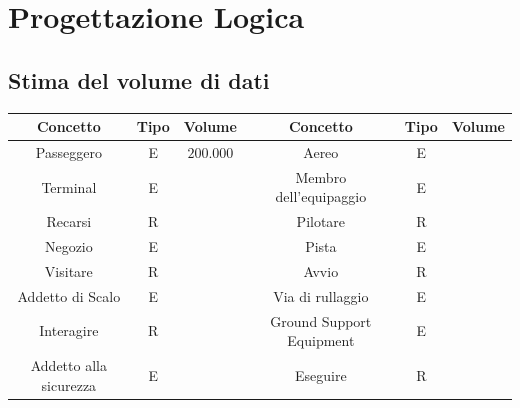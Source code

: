 
\newpage

\enlargethispage{1\linewidth}

\section{Progettazione Logica} %

\subsection{Stima del volume di dati}

\begin{tabular}{ | c  c  c | c  c  c | } %
	\hline
	\textbf{Concetto} & \textbf{Tipo} & \textbf{Volume} & \textbf{Concetto} & \textbf{Tipo} & \textbf{Volume}\\
	\hline
	\textsf{\small Passeggero} & \textsf{\small E} & \textsf{\small $ 200.000$} & \textsf{\small Aereo} & \textsf{\small E} & \textsf{\small $ $}\\
	\hline
	\textsf{\small Terminal} & \textsf{\small E} & \textsf{\small $ $} & \textsf{\small Membro dell'equipaggio} & \textsf{\small E} & \textsf{\small $ $}\\
	\hline
	\textsf{\small Recarsi} & \textsf{\small R} & \textsf{\small $ $} & \textsf{\small Pilotare} & \textsf{\small R} & \textsf{\small $ $}\\
	\hline
	\textsf{\small Negozio} & \textsf{\small E} & \textsf{\small $ $} & \textsf{\small Pista} & \textsf{\small E} & \textsf{\small $ $}\\
	\hline
	\textsf{\small Visitare} & \textsf{\small R} & \textsf{\small $ $} & \textsf{\small Avvio} & \textsf{\small R} & \textsf{\small $ $}\\
	\hline
	\textsf{\small Addetto di Scalo} & \textsf{\small E} & \textsf{\small $ $} & \textsf{\small Via di rullaggio} & \textsf{\small E} & \textsf{\small $ $}\\
	\hline
	\textsf{\small Interagire} & \textsf{\small R} & \textsf{\small $ $} & \textsf{\small Ground Support Equipment} & \textsf{\small E} & \textsf{\small $ $}\\
	\hline
	\textsf{\small Addetto alla sicurezza} & \textsf{\small E} & \textsf{\small $ $} & \textsf{\small Eseguire} & \textsf{\small R} & \textsf{\small $ $}\\

\end{tabular}
